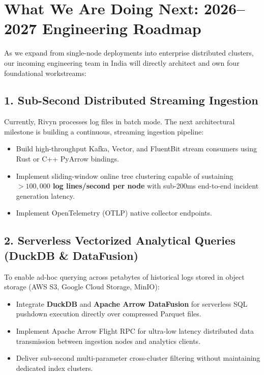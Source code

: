 \documentclass[11pt,a4paper]{article}
\begin{document}
\newpage

\section{What We Are Doing Next: 2026--2027 Engineering Roadmap}

As we expand from single-node deployments into enterprise distributed clusters, our incoming engineering team in India will directly architect and own four foundational workstreams:

\subsection{1. Sub-Second Distributed Streaming Ingestion}
Currently, Rivyn processes log files in batch mode. The next architectural milestone is building a continuous, streaming ingestion pipeline:
\begin{itemize}[leftmargin=*]
    \item Build high-throughput Kafka, Vector, and FluentBit stream consumers using Rust or C++ PyArrow bindings.
    \item Implement sliding-window online tree clustering capable of sustaining \textbf{$>100,000$ log lines/second per node} with sub-200ms end-to-end incident generation latency.
    \item Implement OpenTelemetry (OTLP) native collector endpoints.
\end{itemize}

\subsection{2. Serverless Vectorized Analytical Queries (DuckDB \& DataFusion)}
To enable ad-hoc querying across petabytes of historical logs stored in object storage (AWS S3, Google Cloud Storage, MinIO):
\begin{itemize}[leftmargin=*]
    \item Integrate \textbf{DuckDB} and \textbf{Apache Arrow DataFusion} for serverless SQL pushdown execution directly over compressed Parquet files.
    \item Implement Apache Arrow Flight RPC for ultra-low latency distributed data transmission between ingestion nodes and analytics clients.
    \item Deliver sub-second multi-parameter cross-cluster filtering without maintaining dedicated index clusters.
\end{itemize}
\end{document}
